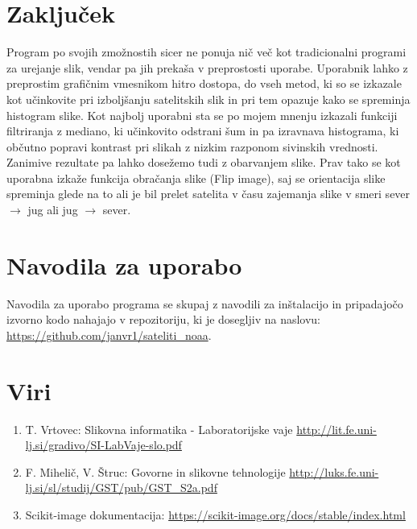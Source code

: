 \documentclass[a4paper, twocolumn]{article}
\begin{document}
\section{Zaključek}
Program po svojih zmožnostih sicer ne ponuja nič več kot tradicionalni programi za urejanje slik, vendar pa jih prekaša v preprostosti uporabe. Uporabnik lahko z preprostim grafičnim vmesnikom hitro dostopa, do vseh metod, ki so se izkazale kot učinkovite pri izboljšanju satelitskih slik in pri tem opazuje kako se spreminja histogram slike. Kot najbolj uporabni sta se po mojem mnenju izkazali funkciji filtriranja z mediano, ki učinkovito odstrani šum in pa izravnava histograma, ki občutno popravi kontrast pri slikah z nizkim razponom sivinskih vrednosti. Zanimive rezultate pa lahko dosežemo tudi z obarvanjem slike. Prav tako se kot uporabna izkaže funkcija obračanja slike (Flip image), saj se orientacija slike spreminja glede na to ali je bil prelet satelita v času zajemanja slike v smeri sever $\rightarrow$ jug ali jug $\rightarrow$ sever.

\section{Navodila za uporabo}
Navodila za uporabo programa se skupaj z navodili za inštalacijo in pripadajočo izvorno kodo nahajajo v repozitoriju, ki je dosegljiv na naslovu:\\
\url{https://github.com/janvr1/sateliti_noaa}.

\small
\section{Viri}
\begin{enumerate}
	\item T. Vrtovec: Slikovna informatika - Laboratorijske vaje \url{http://lit.fe.uni-lj.si/gradivo/SI-LabVaje-slo.pdf}
	\item F. Mihelič, V. Štruc: Govorne in slikovne tehnologije
	\url{http://luks.fe.uni-lj.si/sl/studij/GST/pub/GST_S2a.pdf}
	\item Scikit-image dokumentacija: \url{https://scikit-image.org/docs/stable/index.html}
\end{enumerate}

	
\end{document}

